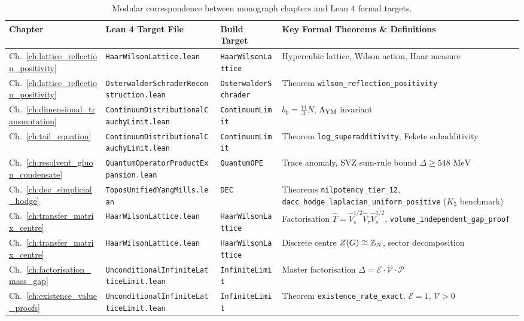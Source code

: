 \begin{table}[htbp]
\centering
\small
\caption{Modular correspondence between monograph chapters and Lean 4 formal targets.}
\label{tab:lean_target_map}
\begin{tabular}{lllp{5.5cm}}
\toprule
\textbf{Chapter} & \textbf{Lean 4 Target File} & \textbf{Build Target} & \textbf{Key Formal Theorems \& Definitions} \\
\midrule
Ch.~\ref{ch:lattice_reflection_positivity} & \texttt{HaarWilsonLattice.lean} & \texttt{HaarWilsonLattice} & Hypercubic lattice, Wilson action, Haar measure \\
Ch.~\ref{ch:lattice_reflection_positivity} & \texttt{OsterwalderSchraderReconstruction.lean} & \texttt{OsterwalderSchrader} & Theorem \texttt{wilson\_reflection\_positivity} \\
Ch.~\ref{ch:dimensional_transmutation} & \texttt{ContinuumDistributionalCauchyLimit.lean} & \texttt{ContinuumLimit} & $b_0 = \frac{11}{3} N$, $\Lambda_{\mathrm{YM}}$ invariant \\
Ch.~\ref{ch:tail_equation} & \texttt{ContinuumDistributionalCauchyLimit.lean} & \texttt{ContinuumLimit} & Theorem \texttt{log\_superadditivity}, Fekete subadditivity \\
Ch.~\ref{ch:resolvent_gluon_condensate} & \texttt{QuantumOperatorProductExpansion.lean} & \texttt{QuantumOPE} & Trace anomaly, SVZ sum-rule bound $\Delta \ge 548\text{ MeV}$ \\
Ch.~\ref{ch:dec_simplicial_hodge} & \texttt{ToposUnifiedYangMills.lean} & \texttt{DEC} & Theorems \texttt{nilpotency\_tier\_12}, \texttt{dacc\_hodge\_laplacian\_uniform\_positive} ($K_5$ benchmark) \\
Ch.~\ref{ch:transfer_matrix_centre} & \texttt{HaarWilsonLattice.lean} & \texttt{HaarWilsonLattice} & Factorisation $\hat{T} = \hat{V}_s^{1/2} \hat{V}_\tau \hat{V}_s^{1/2}$, \texttt{volume\_independent\_gap\_proof} \\
Ch.~\ref{ch:transfer_matrix_centre} & \texttt{HaarWilsonLattice.lean} & \texttt{HaarWilsonLattice} & Discrete centre $Z(G) \cong \mathbb{Z}_N$, sector decomposition \\
Ch.~\ref{ch:factorisation_mass_gap} & \texttt{UnconditionalInfiniteLatticeLimit.lean} & \texttt{InfiniteLimit} & Master factorisation $\Delta = \mathcal{E} \cdot \mathcal{V} \cdot \mathcal{P}$ \\
Ch.~\ref{ch:existence_value_proofs} & \texttt{UnconditionalInfiniteLatticeLimit.lean} & \texttt{InfiniteLimit} & Theorem \texttt{existence\_rate\_exact}, $\mathcal{E}=1$, $\mathcal{V}>0$ \\

\end{tabular}
\end{table}
